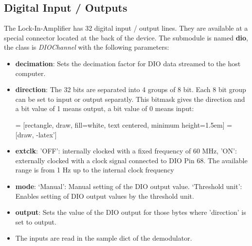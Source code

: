 \documentclass[11pt]{article} %
\begin{document}
\subsection{Digital Input / Outputs}
The Lock-In-Amplifier has 32 digital input / output lines. They are available at a special connector located at the back of the device. The submodule is named {\bf dio}, the class is {\it DIOChannel} with the following parameters:
\begin{itemize}
\item {\bf decimation}: Sets the decimation factor for DIO data streamed to the host computer.
\item {\bf direction}: The 32 bits are separated into 4 groups of 8 bit. Each 8 bit group can be set to input or output separatly. This bitmask gives the direction and a bit value of 1 means output, a bit value of 0 means input:

 = [rectangle, draw, fill=white, text centered, minimum height=1.5em]
 = [draw, -latex']

\item {\bf extclk}: 'OFF': internally clocked with a fixed frequency of 60 MHz, 'ON':  externally clocked with a clock signal connected to DIO Pin 68. The available range is from 1 Hz up to the internal clock frequency
\item {\bf mode}: `Manual': Manual setting of the DIO output value. `Threshold unit': Enables setting of DIO output values by the threshold unit.
\item {\bf output}: Sets the value of the DIO output for those bytes where 'direction' is set to output.
\item The inputs are read in the sample dict of the demodulator.
\end{itemize}
\end{document}
